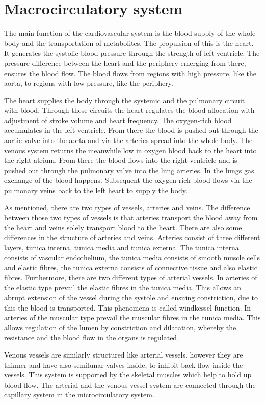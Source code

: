 

\section{Macrocirculatory system}
The main function of the cardiovascular system is the blood supply of the whole body and the transportation of metabolites. The propulsion of this is the heart. It generates the systolic blood pressure through the strength of left ventricle. The pressure difference between the heart and the periphery emerging from there, ensures the blood flow. The blood flows from regions with high pressure, like the aorta, to regions with low pressure, like the periphery.\cite{martini2012}

The heart supplies the body through the systemic and the pulmonary circuit with blood. Through these circuits the heart regulates the blood allocation with adjustment of stroke volume and heart frequency. The oxygen-rich blood accumulates in the left ventricle. From there the blood is pushed out through the aortic valve into the aorta and via the arteries spread into the whole body. The venous system returns the meanwhile low in oxygen blood back to the heart into the right atrium. From there the blood flows into the right ventricle and is pushed out through the pulmonary valve into the lung arteries. In the lungs gas exchange of the blood happens. Subsequent the oxygen-rich blood flows via the pulmonary veins back to the left heart to supply the body.\cite{martini2012}

As mentioned, there are two types of vessels, arteries and veins. The difference between those two types of vessels is that arteries transport the blood away from the heart and veins solely transport blood to the heart. There are also some differences in the structure of arteries and veins.
Arteries consist of three different layers, tunica interna, tunica media and tunica externa. The tunica interna consists of vascular endothelium, the tunica media consists of smooth muscle cells and elastic fibres, the tunica externa consists of connective tissue and also elastic fibres. Furthermore, there are two different types of arterial vessels. In arteries of the elastic type prevail the elastic fibres in the tunica media. This allows an abrupt extension of the vessel during the systole and ensuing constriction, due to this the blood is transported. This phenomena is called windkessel function. In arteries of the muscular type prevail the muscular fibres in the tunica media. This allows regulation of the lumen by constriction and dilatation, whereby the resistance and the blood flow in the organs is regulated.\cite{martini2012}

Venous vessels are similarly structured like arterial vessels, however they are thinner and have also semilunar valves inside, to inhibit back flow inside the vessels. This system is supported by the skeletal muscles which help to hold up blood flow. The arterial and the venous vessel system are connected through the capillary system in the microcirculatory system.\cite{martini2012}
